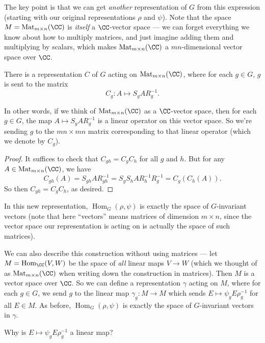 The key point is that we can get \emph{another} representation of $G$ from this expression (starting with our original representations $\rho$ and $\psi$). Note that the space $M = \operatorname{Mat}_{m \times n}(\CC)$ is \emph{itself} a $\CC$-vector space --- we can forget everything we know about how to multiply matrices, and just imagine adding them and multiplying by scalars, which makes $\operatorname{Mat}_{m \times n}(\CC)$ a $mn$-dimensional vector space over $\CC$. 

\begin{lemma}
There is a representation $C$ of $G$ acting on $\operatorname{Mat}_{m \times n}(\CC)$, where for each $g \in G$, $g$ is sent to the matrix \[C_g : A \mapsto S_gAR_g^{-1}.\] 
\end{lemma}

In other words, if we think of $\operatorname{Mat}_{m \times n}(\CC)$ as a $\CC$-vector space, then for each $g \in G$, the map $A \mapsto S_gAR_g^{-1}$ is a linear operator on this vector space. So we're sending $g$ to the $mn \times mn$ matrix corresponding to that linear operator (which we denote by $C_g$).

\begin{proof}
It suffices to check that $C_{gh} = C_gC_h$ for all $g$ and $h$. But for any $A \in \operatorname{Mat}_{m \times n}(\CC)$, we have \[C_{gh}(A) = S_{gh}AR_{gh}^{-1} = S_gS_hAR_h^{-1}R_g^{-1} = C_g(C_h(A)).\] So then $C_{gh} = C_gC_h$, as desired. 
\end{proof}

In this new representation, $\operatorname{Hom}_G(\rho, \psi)$ is exactly the space of $G$-invariant vectors (note that here ``vectors'' means matrices of dimension $m \times n$, since the vector space our representation is acting on is actually the space of such matrices). 

We can also describe this construction without using matrices --- let $M = \operatorname{Hom}_{\CC}(V, W)$ be the space of \emph{all} linear maps $V \to W$ (which we thought of as $\operatorname{Mat}_{m \times n}(\CC)$ when writing down the construction in matrices). Then $M$ is a vector space over $\CC$. So we can define a representation $\gamma$ acting on $M$, where for each $g \in G$, we send $g$ to the linear map $\gamma_g : M \to M$ which sends $E \mapsto \psi_gE\rho_g^{-1}$ for all $E \in M$. As before, $\operatorname{Hom}_G(\rho, \psi)$ is exactly the space of $G$-invariant vectors in $\gamma$. 

\begin{question}
Why is $E \mapsto \psi_gE\rho_g^{-1}$ a linear map?
\end{question}

